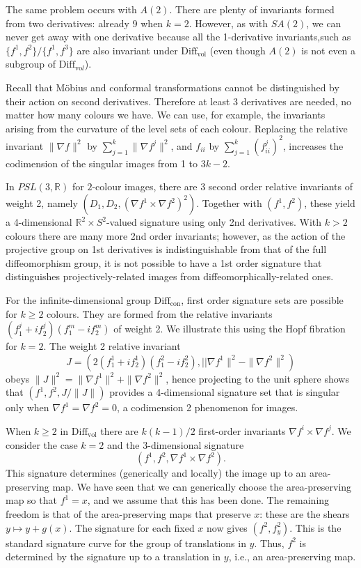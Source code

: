 \documentclass[review,onefignum,onetabnum]{siamonline190516}
\begin{document}
{The same problem occurs with $A(2)$. There are plenty of invariants formed from two derivatives: already 9 when $k=2$. However, as with $SA(2)$, we can never get away with one derivative because all the 1-derivative invariants,such as $\{f^1,f^2\}/\{f^1,f^3\}$ are also invariant under $\mathrm{Diff}_{\mathrm{vol}}$ (even though $A(2)$ is not even a subgroup of $\mathrm{Diff}_{\mathrm{vo}l}$).

Recall that M\"obius and conformal transformations cannot be distinguished by their action on second derivatives. Therefore at least 3 derivatives are needed, no matter how many colours we have. We can use, for example, the invariants arising from the curvature of the level sets of each colour. Replacing the relative invariant $\|\nabla f\|^2$ by $\sum_{j=1}^k \|\nabla f^j\|^2$, and $f_{ii}$ by $\sum_{j=1}^k (f^j_{ii})^2$, increases the codimension of the singular images from 1 to $3k-2$.

In $PSL(3, \mathbb{R})$ for $2$-colour images, there are 3 second order relative invariants of weight 2, namely $(D_1,D_2,(\nabla f^1\times \nabla f^2)^2)$. Together with $(f^1,f^2)$, these yield a 4-dimensional $\mathbb{R}^2\times S^2$-valued signature using only 2nd derivatives. With $k>2$ colours there are many more 2nd order invariants; however, as the action of the projective group on 1st derivatives is indistinguishable from that of the full diffeomorphism group, it is not possible to have a 1st order signature that distinguishes projectively-related images from diffeomorphically-related ones.

For the infinite-dimensional group $\mathrm{Diff}_{\mathrm{con}}$, first order signature sets are possible for $k \ge 2$ colours. They are formed from the relative invariants $(f^j_1 + i f^j_2)(f^m_1 - i f^m_2)$ of weight 2. We illustrate this using the Hopf fibration for $k=2$. The weight 2 relative invariant $$J = (2(f^1_1 + i f^1_2)(f^2_1 - i f^2_2), ||\nabla f^1\|^2 - \|\nabla f^2\|^2)$$ obeys $\|J\|^2 = \|\nabla f^1\|^2 + \|\nabla f^2\|^2$, hence projecting to the unit sphere shows that $(f^1,f^2,J/\|J\|)$ provides a 4-dimensional signature set that is singular only when $\nabla f^1 = \nabla f^2 = 0$, a codimension 2 phenomenon for images.

When $k\ge 2$ in $\mathrm{Diff}_{\mathrm{vol}}$ there are $k(k-1)/2$ first-order invariants $ \nabla f^i \times \nabla f^j$.  We consider the case $k=2$ and the 3-dimensional signature $$ (f^1,f^2, \nabla f^1 \times \nabla f^2).$$ This signature determines (generically and locally) the image up to an area-preserving map.  We have seen that we can generically choose the area-preserving map so that $f^1=x$, and we assume that this has been done. The remaining freedom is that of the area-preserving maps that preserve $x$: these are the shears $y\mapsto y + g(x)$. The signature for each fixed $x$ now gives $(f^2,f^2_y)$. This is the standard signature curve for the group of translations in $y$. Thus, $f^2$ is determined by the signature up to a translation in $y$, i.e., an area-preserving map.

}
\end{document}
